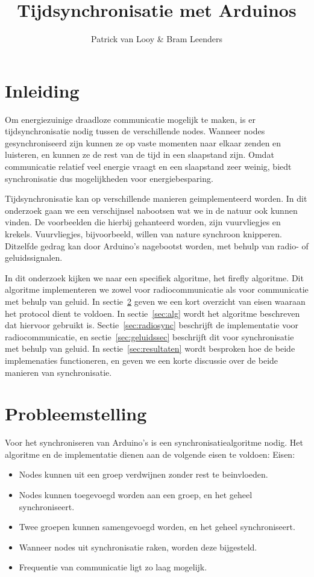 \documentclass[a4paper,10pt]{article}
\title{Tijdsynchronisatie met Arduinos}
\author{Patrick van Looy \& Bram Leenders}
\begin{document}
\maketitle

\section{Inleiding}
Om energiezuinige draadloze communicatie mogelijk te maken, is er tijdsynchronisatie nodig tussen de verschillende nodes. Wanneer nodes gesynchroniseerd zijn kunnen ze op vaste momenten naar elkaar zenden en luisteren, en kunnen ze de rest van de tijd in een slaapstand zijn. Omdat communicatie relatief veel energie vraagt en een slaapstand zeer weinig, biedt synchronisatie dus mogelijkheden voor energiebesparing.

Tijdsynchronisatie kan op verschillende manieren geimplementeerd worden. In dit onderzoek gaan we een verschijnsel nabootsen wat we in de natuur ook kunnen vinden. De voorbeelden die hierbij gehanteerd worden, zijn vuurvliegjes en krekels. Vuurvliegjes, bijvoorbeeld, willen van nature synchroon knipperen\cite{buck1988synchronous}. Ditzelfde gedrag kan door Arduino's nagebootst worden, met behulp van radio- of geluidssignalen.

In dit onderzoek kijken we naar een specifiek algoritme, het firefly algoritme\cite{leidenfrost2009firefly, yang2013firefly}. Dit algoritme implementeren we zowel voor radiocommunicatie als voor communicatie met behulp van geluid. In sectie~\ref{sec:probleemstelling} geven we een kort overzicht van eisen waaraan het protocol dient te voldoen. In sectie~\ref{sec:alg} wordt het algoritme beschreven dat hiervoor gebruikt is. Sectie~\ref{sec:radiosync} beschrijft de implementatie voor radiocommunicatie, en sectie~\ref{sec:geluidssec} beschrijft dit voor synchronisatie met behulp van geluid. In sectie~\ref{sec:resultaten} wordt besproken hoe de beide implemenaties functioneren, en geven we een korte discussie over de beide manieren van synchronisatie.

\section{Probleemstelling}\label{sec:probleemstelling}
Voor het synchroniseren van Arduino's is een synchronisatiealgoritme nodig. Het algoritme en de implementatie dienen aan de volgende eisen te voldoen:
Eisen:
\begin{itemize}
    \item Nodes kunnen uit een groep verdwijnen zonder rest te beinvloeden.
    \item Nodes kunnen toegevoegd worden aan een groep, en het geheel synchroniseert.
    \item Twee groepen kunnen samengevoegd worden, en het geheel synchroniseert.
    \item Wanneer nodes uit synchronisatie raken, worden deze bijgesteld.
    \item Frequentie van communicatie ligt zo laag mogelijk.
\end{itemize}
\end{document}
